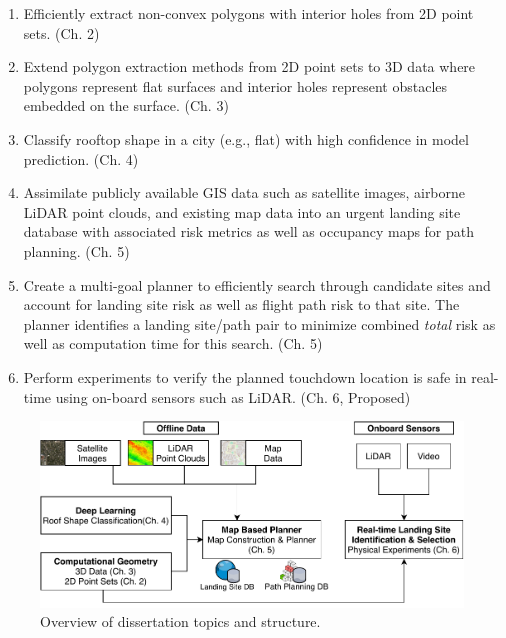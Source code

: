 \begin{enumerate}[noitemsep]
    \item Efficiently extract non-convex polygons with interior holes from 2D point sets. (Ch. 2)
    \item Extend polygon extraction methods from 2D point sets to 3D data where polygons represent flat surfaces and interior holes represent obstacles embedded on the surface. (Ch. 3)
    \item Classify rooftop shape in a city (e.g., flat) with high confidence in model prediction. (Ch. 4)
    \item Assimilate publicly available GIS data such as satellite images, airborne LiDAR point clouds, and existing map data into an urgent landing site database with associated risk metrics as well as occupancy maps for path planning. (Ch. 5)
    \item Create a multi-goal planner to efficiently search through candidate sites and account for landing site risk as well as flight path risk to that site. The planner identifies a landing site/path pair to minimize combined \emph{total} risk as well as computation time for this search. (Ch. 5)
    \item Perform experiments to verify the planned touchdown location is safe in real-time using on-board sensors such as LiDAR. (Ch. 6, Proposed)
\end{enumerate}

\begin{figure}[t]
    \centering
    \includegraphics[width=0.70\linewidth]{chapter_1_intro/imgs/Challenge_Overview-thesis_overview.pdf}
    \caption{Overview of dissertation topics and structure.}
    \label{fig:ch1_thesis_overview}
\end{figure}


